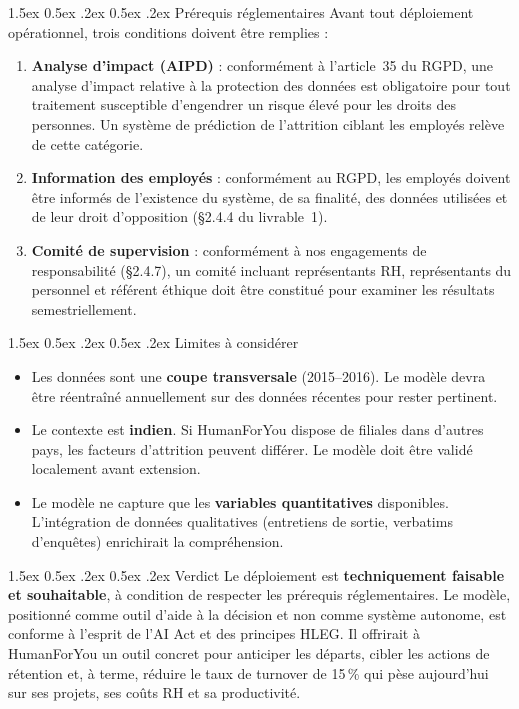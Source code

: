 \documentclass[12pt,a4paper]{article}
\makeatletter
\renewcommand\paragraph{\@startsection{paragraph}{4}{\z@}%
  {1.5ex \@plus 0.5ex \@minus .2ex}%
  {0.5ex \@plus .2ex}%
  {\normalfont\normalsize\bfseries}}
\makeatother
\begin{document}
\paragraph{Prérequis réglementaires} Avant tout déploiement opérationnel, trois conditions doivent être remplies :
\begin{enumerate}
    \item \textbf{Analyse d'impact (AIPD)} : conformément à l'article~35 du RGPD, une analyse d'impact relative à la protection des données est obligatoire pour tout traitement susceptible d'engendrer un risque élevé pour les droits des personnes. Un système de prédiction de l'attrition ciblant les employés relève de cette catégorie.
    \item \textbf{Information des employés} : conformément au RGPD, les employés doivent être informés de l'existence du système, de sa finalité, des données utilisées et de leur droit d'opposition (§2.4.4 du livrable~1).
    \item \textbf{Comité de supervision} : conformément à nos engagements de responsabilité (§2.4.7), un comité incluant représentants RH, représentants du personnel et référent éthique doit être constitué pour examiner les résultats semestriellement.
\end{enumerate}

\paragraph{Limites à considérer}
\begin{itemize}
    \item Les données sont une \textbf{coupe transversale} (2015--2016). Le modèle devra être réentraîné annuellement sur des données récentes pour rester pertinent.
    \item Le contexte est \textbf{indien}. Si HumanForYou dispose de filiales dans d'autres pays, les facteurs d'attrition peuvent différer. Le modèle doit être validé localement avant extension.
    \item Le modèle ne capture que les \textbf{variables quantitatives} disponibles. L'intégration de données qualitatives (entretiens de sortie, verbatims d'enquêtes) enrichirait la compréhension.
\end{itemize}

\paragraph{Verdict} Le déploiement est \textbf{techniquement faisable et souhaitable}, à condition de respecter les prérequis réglementaires. Le modèle, positionné comme outil d'aide à la décision et non comme système autonome, est conforme à l'esprit de l'AI Act et des principes HLEG. Il offrirait à HumanForYou un outil concret pour anticiper les départs, cibler les actions de rétention et, à terme, réduire le taux de turnover de 15\,\% qui pèse aujourd'hui sur ses projets, ses coûts RH et sa productivité.
\end{document}
